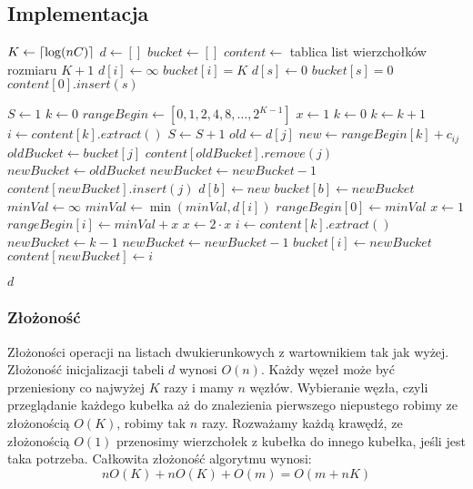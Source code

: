 \documentclass{article}
\DeclarePairedDelimiter\ceil{\lceil}{\rceil}
\begin{document}
\subsection{Implementacja}
\begin{algorithmic}
	\State $K\gets \ceil{\log(nC)}$	
    \State $d\gets []$
    \State $bucket \gets []$
    \State $content\gets$ tablica list wierzchołków rozmiaru $K+1$
		\State $d[i]\gets\infty$
		\State $bucket[i] = K$
	\EndFor
	\State $d[s]\gets 0$
	\State $bucket[s] = 0$
    \State $content[0].insert(s)$

    \State $S \gets 1$
    \State $k \gets 0$
    \State $rangeBegin \gets [0,1,2,4,8,\ldots,2^{K-1}]$
    \State $x \gets 1$
		\State $k\gets 0$
			\State $k\gets k+1$
		\EndWhile
		\State $i\gets content[k].extract()$
		\State $S \gets S+1$
			\State $old\gets d[j]$
			\State $new\gets rangeBegin[k]+c_{ij}$
				\State $oldBucket\gets bucket[j]$
					\State $content[oldBucket].remove(j)$
				\EndIf
				\State $newBucket\gets oldBucket$
					\State $newBucket\gets newBucket-1$
				\EndWhile
				\State $content[newBucket].insert(j)$
				\State $d[b] \gets new$
				\State $bucket[b] \gets newBucket$
			\EndIf
		\EndFor
	\Else
	\State $minVal\gets \infty$
		\State $minVal\gets\min(minVal,d[i])$
	\EndFor
	\State $rangeBegin[0]\gets minVal$
	\State $x\gets 1$
		\State $rangeBegin[i]\gets minVal+x$
		\State $x\gets 2\cdot x$	\EndFor
		\State $i\gets content[k].extract()$
		\State $newBucket\gets k-1$
		\State $newBucket\gets newBucket-1$
		\EndWhile
		\State $bucket[i]\gets newBucket$
		\State $content[newBucket]\gets i$
	\EndWhile
	\EndIf
	\EndWhile 	
	
	\State \Return $d$
  
\EndFunction
\end{algorithmic}


\subsubsection{Złożoność}
Złożoności operacji na listach dwukierunkowych z wartownikiem tak jak wyżej. 
\\ Złożoność inicjalizacji tabeli $d$ wynosi $O(n)$. Każdy węzeł może być przeniesiony co najwyżej $K$ razy  i mamy $n$ węzłów. Wybieranie węzła, czyli przeglądanie każdego kubełka aż do znalezienia pierwszego niepustego robimy ze złożonością $O(K)$, robimy tak $n$ razy. Rozważamy każdą krawędź, ze złożonością $O(1)$ przenosimy wierzchołek z kubełka do innego kubełka, jeśli jest taka potrzeba. Całkowita złożoność algorytmu wynosi:
$$nO(K)+nO(K)+O(m)=O(m+nK)$$
\end{document}

